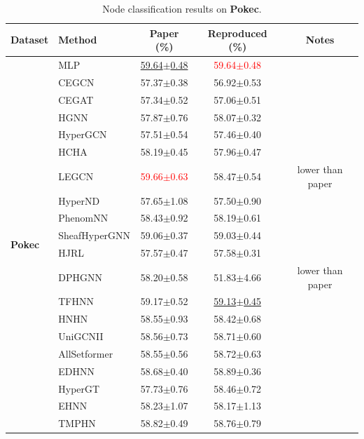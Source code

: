 \documentclass[11pt,a4paper]{article}
\begin{document}
\begin{table}[H]
	\centering\small
	\begin{tabular}{llccc}
		\toprule
		Dataset & Method & Paper (\%) & Reproduced (\%) & Notes \\
		\midrule
		\multirow{20}{*}{\textbf{Pokec}} & MLP               & \underline{59.64$\pm$0.48}   & \textcolor{red}{59.64$\pm$0.48}   &  \\
		 & CEGCN             & 57.37$\pm$0.38   & 56.92$\pm$0.53   &  \\
		 & CEGAT             & 57.34$\pm$0.52   & 57.06$\pm$0.51   & \\
		 & HGNN              & 57.87$\pm$0.76   & 58.07$\pm$0.32   &  \\
		 & HyperGCN          & 57.51$\pm$0.54   & 57.46$\pm$0.40   &  \\
		 & HCHA              & 58.19$\pm$0.45   & 57.96$\pm$0.47   &  \\
		 & LEGCN             & \textcolor{red}{59.66$\pm$0.63}   & 58.47$\pm$0.54   & lower than paper \\
		 & HyperND           & 57.65$\pm$1.08   & 57.50$\pm$0.90   &  \\
		 & PhenomNN          & 58.43$\pm$0.92   & 58.19$\pm$0.61   &  \\
		 & SheafHyperGNN     & 59.06$\pm$0.37   & 59.03$\pm$0.44   & \\
		 & HJRL              & 57.57$\pm$0.47   & 57.58$\pm$0.31   &  \\
		 & DPHGNN            & 58.20$\pm$0.58   & 51.83$\pm$4.66   & lower than paper \\
		 & TFHNN             & 59.17$\pm$0.52   & \underline{59.13$\pm$0.45}   &  \\
		 & HNHN              & 58.55$\pm$0.93   & 58.42$\pm$0.68   &  \\
		 & UniGCNII          & 58.56$\pm$0.73   & 58.71$\pm$0.60   &  \\
		 & AllSetformer      & 58.55$\pm$0.56   & 58.72$\pm$0.63   &  \\
		 & EDHNN             & 58.68$\pm$0.40   & 58.89$\pm$0.36   &  \\
		 & HyperGT           & 57.73$\pm$0.76   & 58.46$\pm$0.72   & \\
		 & EHNN              & 58.23$\pm$1.07   & 58.17$\pm$1.13   &  \\
		 & TMPHN             & 58.82$\pm$0.49   & 58.76$\pm$0.79   & \\
		\bottomrule
	\end{tabular}
	\caption{Node classification results on \textbf{Pokec}.}
\end{table}
\end{document}
